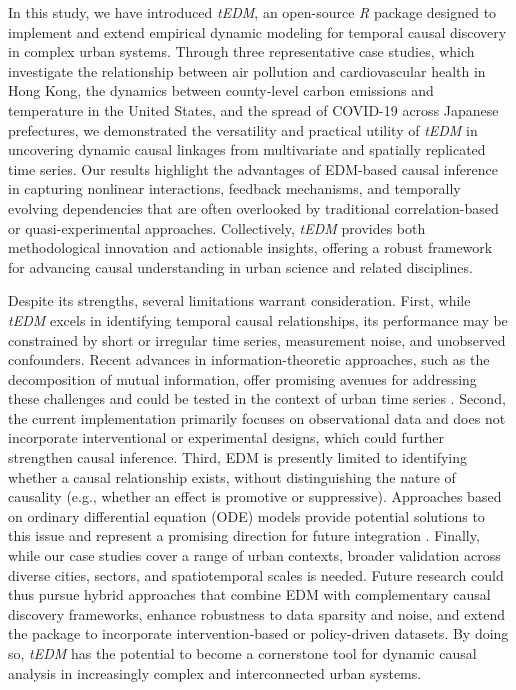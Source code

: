 \documentclass[authoryear,preprint,review,12pt]{elsarticle}
\begin{document}
In this study, we have introduced \textit{tEDM}, an open-source \textit{R} package designed to implement and extend empirical dynamic modeling for temporal causal discovery in complex urban systems. Through three representative case studies, which investigate the relationship between air pollution and cardiovascular health in Hong Kong, the dynamics between county-level carbon emissions and temperature in the United States, and the spread of COVID-19 across Japanese prefectures, we demonstrated the versatility and practical utility of \textit{tEDM} in uncovering dynamic causal linkages from multivariate and spatially replicated time series. Our results highlight the advantages of EDM-based causal inference in capturing nonlinear interactions, feedback mechanisms, and temporally evolving dependencies that are often overlooked by traditional correlation-based or quasi-experimental approaches. Collectively, \textit{tEDM} provides both methodological innovation and actionable insights, offering a robust framework for advancing causal understanding in urban science and related disciplines.

Despite its strengths, several limitations warrant consideration. First, while \textit{tEDM} excels in identifying temporal causal relationships, its performance may be constrained by short or irregular time series, measurement noise, and unobserved confounders. Recent advances in information-theoretic approaches, such as the decomposition of mutual information, offer promising avenues for addressing these challenges and could be tested in the context of urban time series \citep{sanchez2024surd}. Second, the current implementation primarily focuses on observational data and does not incorporate interventional or experimental designs, which could further strengthen causal inference. Third, EDM is presently limited to identifying whether a causal relationship exists, without distinguishing the nature of causality (e.g., whether an effect is promotive or suppressive). Approaches based on ordinary differential equation (ODE) models provide potential solutions to this issue and represent a promising direction for future integration \citep{park2023gobi}. Finally, while our case studies cover a range of urban contexts, broader validation across diverse cities, sectors, and spatiotemporal scales is needed. Future research could thus pursue hybrid approaches that combine EDM with complementary causal discovery frameworks, enhance robustness to data sparsity and noise, and extend the package to incorporate intervention-based or policy-driven datasets. By doing so, \textit{tEDM} has the potential to become a cornerstone tool for dynamic causal analysis in increasingly complex and interconnected urban systems.
\end{document}
